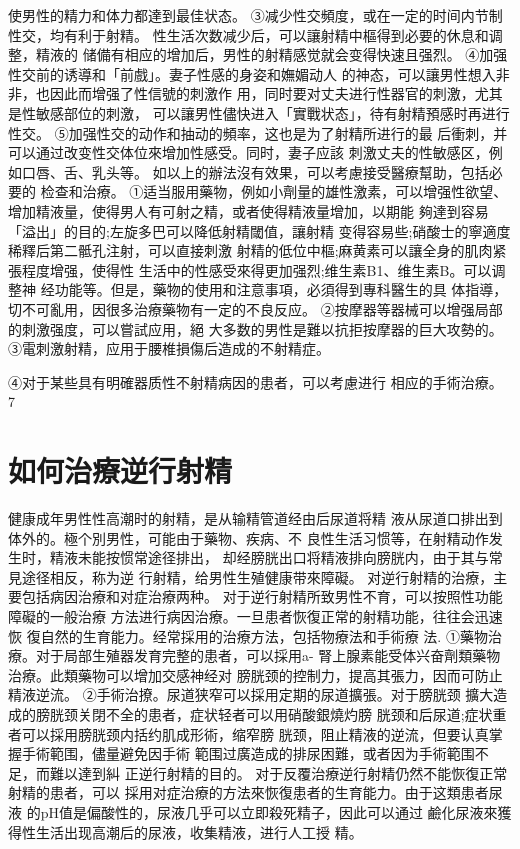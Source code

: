\documentclass[12pt,UTF8]{ctexbook}
\begin{document}
使男性的精力和体力都達到最佳状态。
③减少性交頻度，或在一定的时间内节制性交，均有利于射精。
性生活次数减少后，可以讓射精中樞得到必要的休息和调整，精液的
储備有相应的增加后，男性的射精感觉就会变得快速且强烈。
④加强性交前的诱導和「前戲」。妻子性感的身姿和嫵媚动人
的神态，可以讓男性想入非非，也因此而增强了性信號的刺激作
用，同时要对丈夫进行性器官的刺激，尤其是性敏感部位的刺激，
可以讓男性儘快进入「實戰状态」，待有射精預感时再进行性交。
⑤加强性交的动作和抽动的頻率，这也是为了射精所进行的最
后衝刺，并可以通过改变性交体位來增加性感受。同时，妻子应該
刺激丈夫的性敏感区，例如口唇、舌、乳头等。
如以上的辦法沒有效果，可以考慮接受醫療幫助，包括必要的
检查和治療。
①适当服用藥物，例如小劑量的雄性激素，可以增强性欲望、
增加精液量，使得男人有可射之精，或者使得精液量增加，以期能
夠達到容易「溢出」的目的;左旋多巴可以降低射精閾值，讓射精
变得容易些;硝酸士的寧適度稀釋后第二骶孔注射，可以直接刺激
射精的低位中樞;麻黄素可以讓全身的肌肉紧張程度增强，使得性
生活中的性感受來得更加强烈;维生素B1、维生素B。可以调整神
经功能等。但是，藥物的使用和注意事項，必須得到專科醫生的具
体指導，切不可亂用，因很多治療藥物有一定的不良反应。
②按摩器等器械可以增强局部的刺激强度，可以嘗試应用，絕
大多数的男性是難以抗拒按摩器的巨大攻勢的。
③電刺激射精，应用于腰椎損傷后造成的不射精症。

④对于某些具有明確器质性不射精病因的患者，可以考慮进行
相应的手術治療。
7
\section{如何治療逆行射精}
健康成年男性性高潮时的射精，是从输精管道经由后尿道将精
液从尿道口排出到体外的。極个別男性，可能由于藥物、疾病、不
良性生活习惯等，在射精动作发生时，精液未能按惯常途径排出，
却经膀胱出口将精液排向膀胱内，由于其与常見途径相反，称为逆
行射精，给男性生殖健康带來障礙。
对逆行射精的治療，主要包括病因治療和对症治療两种。
对于逆行射精所致男性不育，可以按照性功能障礙的一般治療
方法进行病因治療。一旦患者恢復正常的射精功能，往往会迅速恢
復自然的生育能力。经常採用的治療方法，包括物療法和手術療
法.
①藥物治療。对于局部生殖器发育完整的患者，可以採用a-
腎上腺素能受体兴奋劑類藥物治療。此類藥物可以增加交感神经对
膀胱颈的控制力，提高其張力，因而可防止精液逆流。
②手術治撩。尿道狭窄可以採用定期的尿道擴張。对于膀胱颈
擴大造成的膀胱颈关閉不全的患者，症状轻者可以用硝酸銀燒灼膀
胱颈和后尿道;症状重者可以採用膀胱颈内括约肌成形術，缩窄膀
胱颈，阻止精液的逆流，但要认真掌握手術範围，儘量避免因手術
範围过廣造成的排尿困難，或者因为手術範围不足，而難以達到糾
正逆行射精的目的。
对于反覆治療逆行射精仍然不能恢復正常射精的患者，可以
採用对症治療的方法來恢復患者的生育能力。由于这類患者尿液
的pH值是偏酸性的，尿液几乎可以立即殺死精子，因此可以通过
鹼化尿液來獲得性生活出现高潮后的尿液，收集精液，进行人工授
精。
\end{document}
